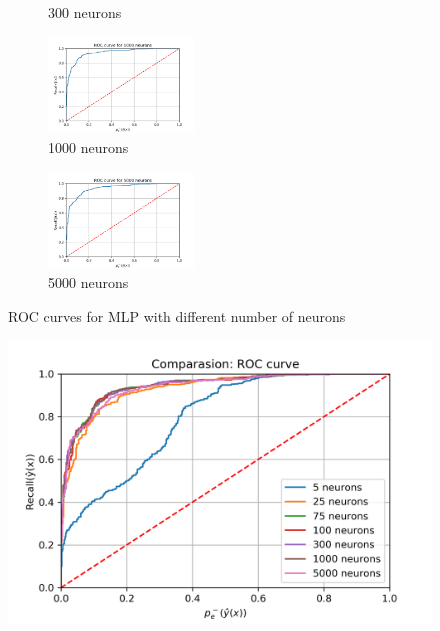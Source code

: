 \documentclass[a4paper]{article}    %
\begin{document}
\begin{figure}[H]
\begin{subfigure}{0.32\textwidth}
        \caption{300 neurons}
        \label{fig:mlp-300_roc}
    \end{subfigure}
    \hfill
    \begin{subfigure}{0.32\textwidth}
        \centering
        \includegraphics[width=3.85cm]{ROC_1000}
        \caption{1000 neurons}
        \label{fig:mlp-1000_roc}
    \end{subfigure}
    \hfill
    \begin{subfigure}{0.32\textwidth}
        \centering
        \includegraphics[width=3.85cm]{ROC_5000}
        \caption{5000 neurons}
        \label{fig:mlp-5000_roc}
    \end{subfigure}
    \hfill
    \caption{ROC curves for MLP with different number of neurons}
    \label{fig:mlp-ROC_N_neurons}
\end{figure}

\begin{figure}[H]
    \centering
    \includegraphics[width=12cm]{ROC_comparasion}
    \caption{}
    \label{fig:mlp-roc_comparasion}
\end{figure}
\end{document}
